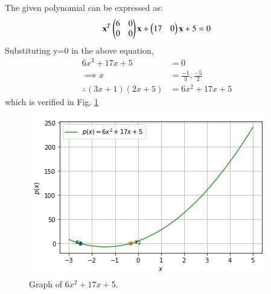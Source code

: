 
The given polynomial can be expressed as:
\begin{align}
\mathbf{x}^T \begin{pmatrix}6 & 0\\0 & 0\end{pmatrix}\mathbf{x}+ \begin{pmatrix}17 & 0\end{pmatrix}\mathbf{x}+5=0
\end{align}
Substituting y=0 in the above equation,
\begin{align}
 6x^2+17x+5 &=0\\
\implies x&=\frac{-1}3{},\frac{-5}{2}\\
\therefore (3x+1)(2x+5) &=6x^2+17x+5
\end{align}
%
which is verified in Fig.     \ref{quadform/16/Fig:Graph Of $x^2+7x+10 &=$.}

\begin{figure}[ht!]
    \centering
    \includegraphics[width=\columnwidth]{solutions/su2021/2/16/Graph.png}
    \caption{Graph of $6x^2+17x+5$.}
    \label{quadform/16/Fig:Graph Of $x^2+7x+10 &=$.}
\end{figure}


